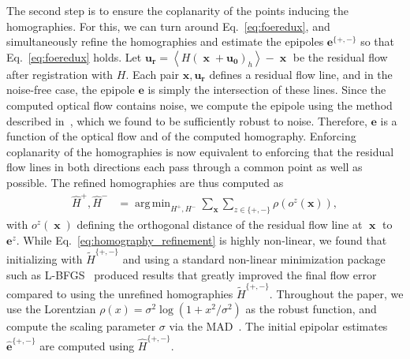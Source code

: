 \documentclass[10pt,twocolumn,letterpaper]{article}
\DeclareMathOperator*{\argmin}{arg\,min}
\DeclareMathOperator{\x}{\mathbf{x}}
\begin{document}
The second step is to ensure the coplanarity of the points inducing the homographies.
For this, we can turn around Eq.~\eqref{eq:foeredux}, and simultaneously refine the homographies and estimate the epipoles $\mathbf{e}^{ \lbrace +,- \rbrace }$ so that Eq.~\eqref{eq:foeredux} holds.
Let $\mathbf{u_r} = \left\langle H (\x+\mathbf{u_0})_h \right\rangle - \x$ be the residual flow after registration with $H$.
Each pair $\mathbf{x}, \mathbf{u_r}$ defines a residual flow line, and in the noise-free case, the epipole $\mathbf{e}$ is simply the intersection of these lines.
Since the computed optical flow contains noise, we compute the epipole using the method described in~\cite{MacLean:1999:RemovalOfTranslationBias}, which we found to be sufficiently robust to noise.
Therefore, $\mathbf{e}$ is a function of the optical flow and of the computed homography.
Enforcing coplanarity of the homographies is now equivalent to
enforcing that the residual flow lines in both directions each pass through a common point as well as possible.
The refined homographies are thus computed as
\begin{align}
\hat{H}^+, \hat{H}^- &= \argmin_{H^+, H^-} \sum_{\mathbf{x}} \sum_{z \in \lbrace +,- \rbrace} \rho \left( o^z (\mathbf{x}) \right),
\label{eq:homography_refinement}
\end{align}
with $o^{z}(\x)$ defining the orthogonal distance of the residual flow line at $\x$
to $\mathbf{e}^z$.
While Eq.~\eqref{eq:homography_refinement} is highly non-linear, we found that initializing with $\tilde{H}^{ \{ +,- \} }$ and using a standard non-linear minimization package such as L-BFGS~\cite{Nocedal:1980:LBFGS} produced results that greatly improved the final flow error compared to using the unrefined homographies $\tilde{H}^{ \{ +,- \} }$.
Throughout the paper, we use the Lorentzian $\rho(x) = \sigma^2 \log \left( 1 + {x^2}/{\sigma^2} \right)$ as the robust function, and compute the scaling parameter $\sigma$ via the MAD~\cite{Black:1999:EdgesAsOutliers}.
The initial epipolar estimates $\mathbf{\hat{e}}^{\lbrace +,- \rbrace }$ are computed using $\hat{H}^{ \{+,- \} }$.
\end{document}
